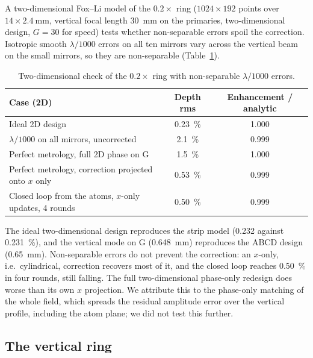 \documentclass[11pt]{article}
\begin{document}
A two-dimensional Fox--Li model of the $0.2\times$ ring ($1024\times192$ points over
$14\times\SI{2.4}{\milli\metre}$, vertical focal length \SI{30}{\milli\metre} on the primaries,
two-dimensional design, $G = 30$ for speed) tests whether non-separable errors spoil the correction.
Isotropic smooth $\lambda/1000$ errors on all ten mirrors vary across the vertical beam on the small
mirrors, so they are non-separable (Table~\ref{tab:2d}).

\begin{table}[htbp]
\centering
\caption{Two-dimensional check of the $0.2\times$ ring with non-separable $\lambda/1000$ errors.}
\label{tab:2d}
\small
\begin{tabular}{@{}lcc@{}}
\toprule
Case (2D) & Depth rms & Enhancement / analytic \\
\midrule
Ideal 2D design & \SI{0.23}{\percent} & 1.000 \\
$\lambda/1000$ on all mirrors, uncorrected & \SI{2.1}{\percent} & 0.999 \\
Perfect metrology, full 2D phase on G & \SI{1.5}{\percent} & 1.000 \\
Perfect metrology, correction projected onto $x$ only & \SI{0.53}{\percent} & 0.999 \\
Closed loop from the atoms, $x$-only updates, 4 rounds & \SI{0.50}{\percent} & 0.999 \\
\bottomrule
\end{tabular}
\end{table}

The ideal two-dimensional design reproduces the strip model (0.232 against \SI{0.231}{\percent}), and
the vertical mode on G (\SI{0.648}{\milli\metre}) reproduces the ABCD design (\SI{0.65}{\milli\metre}).
Non-separable errors do not prevent the correction: an $x$-only, i.e.\ cylindrical, correction recovers
most of it, and the closed loop reaches \SI{0.50}{\percent} in four rounds, still falling. The full
two-dimensional phase-only redesign does worse than its own $x$ projection. We attribute this to the
phase-only matching of the whole field, which spreads the residual amplitude error over the vertical
profile, including the atom plane; we did not test this further.

\subsection{The vertical ring}
\end{document}
